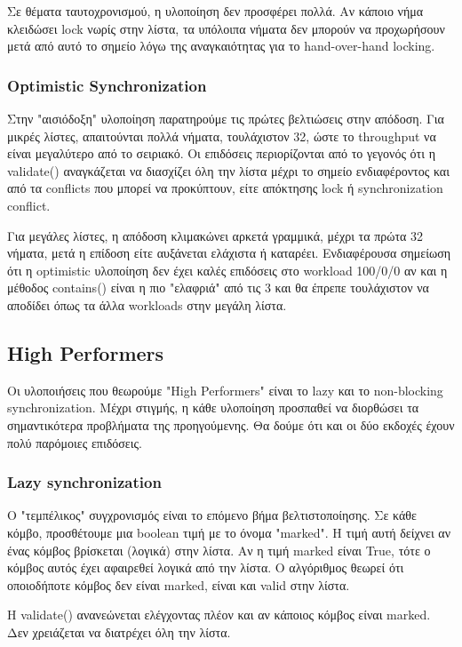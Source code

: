 \documentclass[../final_report.tex]{subfiles}
\begin{document}
Σε θέματα ταυτοχρονισμού, η υλοποίηση δεν προσφέρει πολλά. Αν κάποιο νήμα κλειδώσει lock νωρίς στην λίστα, τα υπόλοιπα νήματα
δεν μπορούν να προχωρήσουν μετά από αυτό το σημείο λόγω της αναγκαιότητας για το hand-over-hand locking. 

\subsubsection*{Optimistic Synchronization}
Στην "αισιόδοξη" υλοποίηση παρατηρούμε τις πρώτες βελτιώσεις στην απόδοση. Για μικρές λίστες, απαιτούνται πολλά νήματα, τουλάχιστον 32, ώστε το throughput
να είναι μεγαλύτερο από το σειριακό. Οι επιδόσεις περιορίζονται από το γεγονός ότι η validate() αναγκάζεται να διασχίζει όλη την λίστα μέχρι το σημείο ενδιαφέροντος
και από τα conflicts που μπορεί να προκύπτουν, είτε απόκτησης lock ή synchronization conflict.

Για μεγάλες λίστες, η απόδοση κλιμακώνει αρκετά γραμμικά, μέχρι τα πρώτα 32 νήματα, μετά η επίδοση είτε αυξάνεται ελάχιστα
ή καταρέει. Ενδιαφέρουσα σημείωση ότι η optimistic υλοποίηση δεν έχει καλές επιδόσεις στο workload 100/0/0 αν και η μέθοδος
contains() είναι η πιο "ελαφριά" από τις 3 και θα έπρεπε τουλάχιστον να αποδίδει όπως τα άλλα workloads στην μεγάλη λίστα.

\subsection{High Performers}
Οι υλοποιήσεις που θεωρούμε "High Performers" είναι το lazy και το non-blocking synchronization. Μέχρι στιγμής, η κάθε υλοποίηση προσπαθεί
να διορθώσει τα σημαντικότερα προβλήματα της προηγούμενης. Θα δούμε ότι και οι δύο εκδοχές έχουν πολύ παρόμοιες επιδόσεις.

\subsubsection{Lazy synchronization}
Ο "τεμπέλικος" συγχρονισμός είναι το επόμενο βήμα βελτιστοποίησης. Σε κάθε κόμβο, προσθέτουμε μια boolean τιμή με το όνομα
"marked". Η τιμή αυτή δείχνει αν ένας κόμβος βρίσκεται (λογικά) στην λίστα. Αν η τιμή marked είναι True, τότε ο κόμβος αυτός
έχει αφαιρεθεί λογικά από την λίστα. Ο αλγόριθμος θεωρεί ότι οποιοδήποτε κόμβος δεν είναι marked, είναι και valid στην λίστα.

Η validate() ανανεώνεται ελέγχοντας πλέον και αν κάποιος κόμβος είναι marked. Δεν χρειάζεται να διατρέχει όλη την λίστα.
\end{document}
